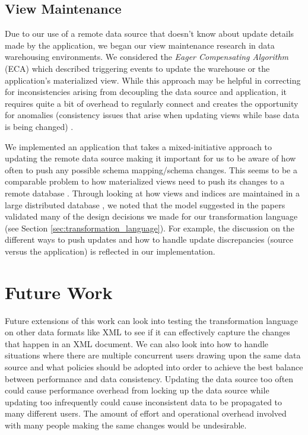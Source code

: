 \documentclass[12pt]{article}
\begin{document}
\subsection{View Maintenance}
Due to our use of a remote data source that doesn't know about update details made by the application, we began our view maintenance research in data warehousing environments.  We considered the \textit{Eager Compensating Algorithm} (ECA) \cite{zhuge1995view} which described triggering events to update the warehouse or the application's materialized view.  While this approach may be helpful in correcting for inconsistencies arising from decoupling the data source and application, it requires quite a bit of overhead to regularly connect and creates the opportunity for anomalies (consistency issues that arise when updating views while base data is being changed) \cite{zhuge1995view}.

We implemented an application that takes a mixed-initiative approach to updating the remote data source making it important for us to be aware of how often to push any possible schema mapping/schema changes. This seems to be a comparable problem to how materialized views need to push its changes to a remote database \cite{agrawal1997efficient, agrawal2009asynchronous, zhou2007lazy}. Through looking at how views and indices are maintained in a large distributed database \cite{agrawal1997efficient}, we noted that the model suggested in the papers validated many of the design decisions we made for our transformation language (see Section \ref{sec:transformation_language}). For example, the discussion on the different ways to push updates and how to handle update discrepancies (source versus the application) \cite{agrawal1997efficient} is reflected in our implementation. 



\section{Future Work}
Future extensions of this work can look into testing the transformation language on other data formats like XML to see if it can effectively capture the changes that happen in an XML document. We can also look into how to handle situations where there are multiple concurrent users drawing upon the same data source and what policies should be adopted into order to achieve the best balance between performance and data consistency. Updating the data source too often could cause performance overhead from locking up the data source while updating too infrequently could cause inconsistent data to be propagated to many different users. The amount of effort and operational overhead involved with many people making the same changes would be undesirable. 
\end{document}
